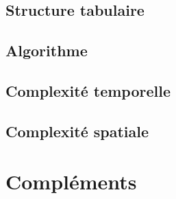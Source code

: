 \documentclass[a4paper, titlepage]{article}
\begin{document}
	\subsection{Structure tabulaire}
	\subsection{Algorithme}
	\subsection{Complexité temporelle}
	\subsection{Complexité spatiale}

\section{Compléments}
\end{document}
